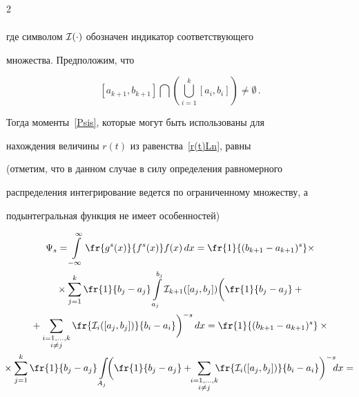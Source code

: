 \begin{multicols}{2}
\begin{gather*}
\end{gather*}

где символом $\mathcal I(\cdot)$ обозначен индикатор соответствующего

множества. Предположим, что


$$

[a_{k+1},b_{k+1}]\bigcap\left(\bigcup\limits_{i=1}^k[a_i,b_i]\right)\neq\emptyset\,.

$$

Тогда моменты~\eqref{Psis}, которые могут быть использованы для

нахождения величины $r(t)$ из равенства~\eqref{r(t)Ln}, равны

(отметим, что в данном случае в силу определения равномерного

распределения интегрирование ведется по ограниченному множеству, а

подынтегральная функция не имеет особенностей)



\noindent

\begin{multline*}

\Psi_s=\int\limits_{-\infty}^\infty\fr{g^s(x)}{f^s(x)}f(x)\,dx=

\fr{1}{(b_{k+1}-a_{k+1})^s}\times\\

{}\times

\sum\limits_{j=1}^k\fr{1}{b_j-a_j}

\int\limits_{a_j}^{b_j}\Id_{k+1}([a_j,b_j])

\bigg(\fr{1}{b_j-a_j}+{}\\

{}+\sum_{\substack{i=1,\ldots,k\\i\neq

j}}\fr{\Id_i([a_j,b_j])}{b_i-a_i}\bigg)^{-s}\,dx=

\fr{1}{(b_{k+1}-a_{k+1})^s}\times{}\\

\!\!\!{}\times

\sum\limits_{j=1}^k\fr{1}{b_j-a_j}

\int\limits_{A_j}\!\!\bigg(\fr{1}{b_j-a_j}+\!\!\sum_{\substack{i=1,\ldots,k\\i\neq

j}}\!\!\!\fr{\Id_i([a_j,b_j])}{b_i-a_i}\bigg)^{-s}\!\!dx={}\hspace*{-3.11491pt}\\


\end{multline*}
\end{multicols}

